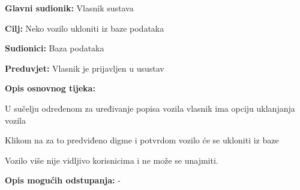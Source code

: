 					\noindent {}
					\begin{packed_item}
	
						\item \textbf{Glavni sudionik: }Vlasnik sustava
						\item  \textbf{Cilj: }Neko vozilo ukloniti iz baze podataka
						\item  \textbf{Sudionici: }Baza podataka
						\item  \textbf{Preduvjet: }Vlasnik je prijavljen u usustav
						\item  \textbf{Opis osnovnog tijeka:}
						
						\item[] \begin{packed_enum}
							\item U sučelju određenom za uređivanje popisa vozila vlasnik ima opciju uklanjanja vozila
							\item Klikom na za to predviđeno digme i potvrdom vozilo će se ukloniti iz baze
							\item Vozilo više nije vidljivo korisnicima i ne može se unajmiti. 
						\end{packed_enum}
						
						\item  \textbf{Opis mogućih odstupanja: }-
					\end{packed_item}
					
